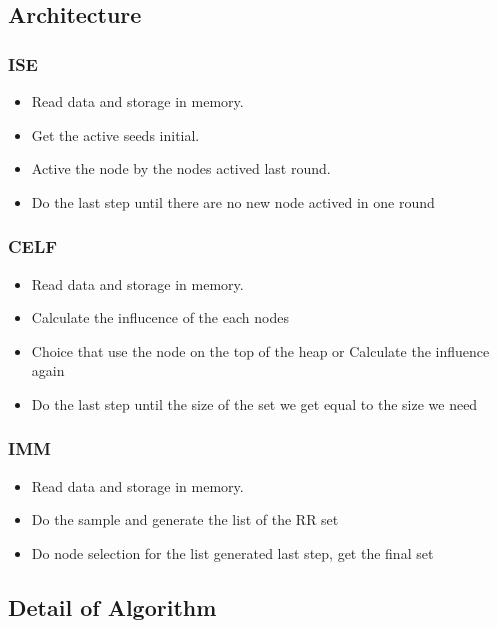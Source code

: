 \documentclass[conference,compsoc]{IEEEtran}
\begin{document}
  \subsection{Architecture}
    \subsubsection{ISE}
      \begin{itemize}
        \item Read data and storage in memory.
        \item Get the active seeds initial.
        \item Active the node by the nodes actived last round.
        \item Do the last step until there are no new node actived in one round
      \end{itemize}
    \subsubsection{CELF}
      \begin{itemize}
        \item Read data and storage in memory.
        \item Calculate the influcence of the each nodes
        \item Choice that use the node on the top of the heap or Calculate the influence again
        \item Do the last step until the size of the set we get equal to the size we need
      \end{itemize}
    \subsubsection{IMM}
      \begin{itemize}
        \item Read data and storage in memory.
        \item Do the sample and generate the list of the RR set
        \item Do node selection for the list generated last step, get the final set
      \end{itemize}
  \subsection{Detail of Algorithm}
\end{document}
